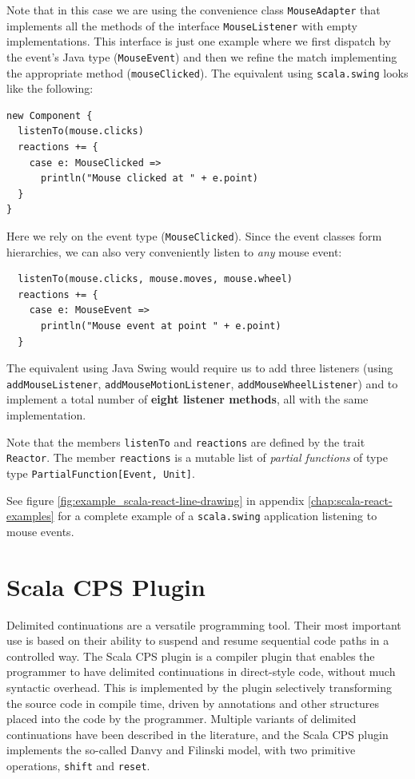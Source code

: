 Note that in this case we are using the convenience class \texttt{Mouse\-Adapter} that implements all the methods of the interface \texttt{Mouse\-Listener} with empty implementations. This interface is just one example where we first dispatch by the event's Java type (\texttt{MouseEvent}) and then we refine the match implementing the appropriate method (\texttt{mouseClicked}). The equivalent using \texttt{scala.swing} looks like the following:
\begin{lstlisting}
new Component {
  listenTo(mouse.clicks)
  reactions += {
    case e: MouseClicked =>
      println("Mouse clicked at " + e.point)
  }
}
\end{lstlisting}

Here we rely on the event type (\texttt{MouseClicked}). Since the event classes form hierarchies, we can also very conveniently listen to \emph{any} mouse event:
\begin{lstlisting}
  listenTo(mouse.clicks, mouse.moves, mouse.wheel)
  reactions += {
    case e: MouseEvent =>
      println("Mouse event at point " + e.point)
  }
\end{lstlisting}

The equivalent using Java Swing would require us to add three listeners (using \texttt{add\-Mouse\-Listener}, \texttt{add\-Mouse\-Motion\-Listener}, \texttt{add\-Mouse\-Wheel\-Listener}) and to implement a total number of \textbf{eight listener methods}, all with the same implementation.

Note that the members \texttt{listenTo} and \texttt{reactions} are defined by the trait \texttt{Reactor}. The member \texttt{reactions} is a mutable list of \emph{partial functions} of type type \texttt{PartialFunction[Event, Unit]}.

See figure \ref{fig:example_scala-react-line-drawing} in appendix \ref{chap:scala-react-examples} for a complete example of a \texttt{scala.swing} application listening to mouse events.

\section{Scala CPS Plugin}\label{sec:theory_scala-cps-plugin}

Delimited continuations are a versatile programming tool. Their most important use is based on their ability to suspend and resume sequential code paths in a controlled way. The Scala CPS plugin is a compiler plugin that enables the programmer to have delimited continuations in direct-style code, without much syntactic overhead. This is implemented by the plugin selectively transforming the source code in compile time, driven by annotations and other structures placed into the code by the programmer. Multiple variants of delimited continuations have been described in the literature, and the Scala CPS plugin implements the so-called Danvy and Filinski model, with two primitive operations, \texttt{shift} and \texttt{reset}.

